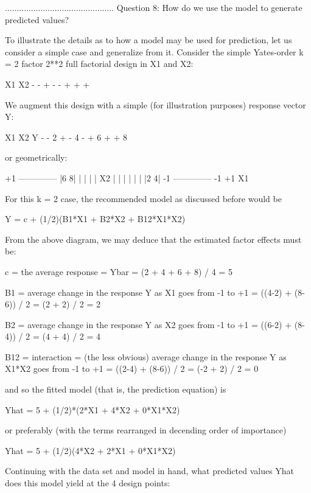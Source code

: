 ..............................................
Question 8: How do we use the model to generate
            predicted values?

To illustrate the details as to how a model may be
used for prediction, let us consider a simple case
and generalize from it.  Consider the simple
Yates-order k = 2 factor 2**2 full factorial
design in X1 and X2:

        X1     X2
         -      -
         +      -
         -      +
         +      +

We augment this design with a simple (for
illustration purposes) response vector Y:


        X1     X2      Y
         -      -      2
         +      -      4
         -      +      6
         +      +      8

or geometrically:

       +1 --------------
          |6          8|
          |            |
          |            |
     X2   |            |
          |            |
          |            |
          |2          4|
       -1 --------------
          -1          +1
                X1

For this k = 2 case, the recommended model as
discussed before would be

   Y = c + (1/2)(B1*X1 + B2*X2 + B12*X1*X2)

From the above diagram, we may deduce that the
estimated factor effects must be:

   c   = the average response = Ybar
       = (2 + 4 + 6 + 8) / 4 = 5

   B1  = average change in the response Y as X1
         goes from -1 to +1
       = ((4-2) + (8-6)) / 2 = (2 + 2) / 2 = 2

   B2  = average change in the response Y as X2
         goes from -1 to +1
       = ((6-2) + (8-4)) / 2 = (4 + 4) / 2 = 4

   B12 = interaction = (the less obvious) average change
         in the response Y as X1*X2 goes from -1 to +1
       = ((2-4) + (8-6)) / 2 = (-2 + 2) / 2 = 0

and so the fitted model (that is, the prediction
equation) is

   Yhat = 5 + (1/2)*(2*X1 + 4*X2 + 0*X1*X2)

or preferably (with the terms rearranged in
decending order of importance)

   Yhat = 5 + (1/2)(4*X2 + 2*X1 + 0*X1*X2)

Continuing with the data set and model in hand,
what predicted values Yhat does this model yield
at the 4 design points:

